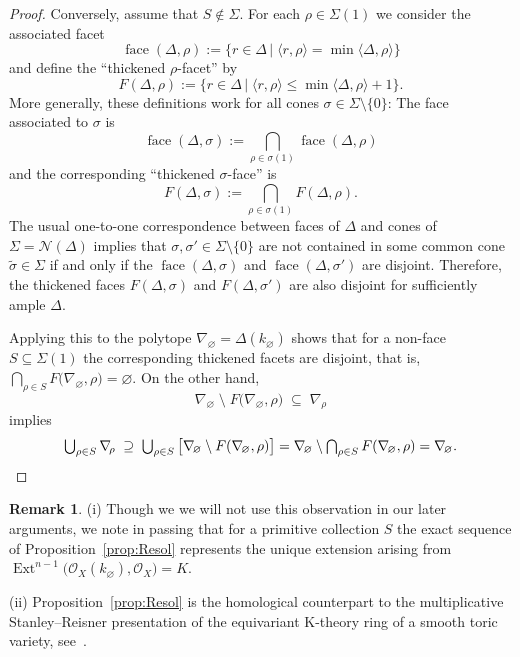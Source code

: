 \documentclass[11pt]{article}
\theoremstyle{definition}
\newtheorem{rema}[theo]{Remark}
\numberwithin{equation}{section}
\newcommand{\cN}{\mathcal{N}}
\DeclareMathOperator{\face}{face}
\newcommand{\CO}{{\mathcal O}}
\newcommand{\til}[1]{\widetilde{#1}}
\newcommand{\gExt}{\operatorname{Ext}}
\newcommand{\kst }{\,|\;}
\newcommand{\kk}{K}
\newcommand{\normal}{\cN}
\begin{document}
\begin{proof}
Conversely, assume that $S\notin\Sigma$.
For each $\rho\in\Sigma(1)$ we consider 
the associated facet 
$$
\face(\Delta,\rho):=\{r\in\Delta\kst \langle r,\rho\rangle
=\min\langle\Delta,\rho\rangle\}
$$ 
and define the ``thickened $\rho$-facet'' 
by
$$
F(\Delta,\rho):=\{r\in\Delta\kst \langle r,
\rho\rangle \leq
\min\langle\Delta,\rho\rangle + 1\}.
$$
More generally, these definitions work 
for all cones 
$\sigma\in\Sigma\setminus\{0\}$:
The face associated to $\sigma$ is
$$
\face(\Delta,\sigma):=
\bigcap_{\rho\in\sigma(1)}\face(\Delta,\rho)
$$
and the corresponding ``thickened 
$\sigma$-face'' is 
$$
F(\Delta,\sigma):=\bigcap_{\rho\in\sigma(1)}
F(\Delta,\rho).
$$
The usual one-to-one correspondence between 
faces of $\Delta$ and cones of
$\Sigma=\normal(\Delta)$ implies that 
$\sigma,\sigma'\in\Sigma\setminus\{0\}$
are not contained in some common cone 
$\til{\sigma}\in\Sigma$ if and only if the
$\face(\Delta,\sigma)$ and 
$\face(\Delta,\sigma')$ are disjoint. 
Therefore, the thickened faces 
$F(\Delta,\sigma)$ and $F(\Delta,\sigma')$ are 
also disjoint for sufficiently ample $\Delta$.

Applying this to the polytope 
$\nabla_{\!\varnothing}=\Delta(k_{\varnothing})$
shows that for a non-face $S\subseteq\Sigma(1)$
the corresponding thickened facets are disjoint, 
that is, 
$\bigcap_{\rho\in S}F\big(\nabla_{\!\varnothing},
\rho\big)=\varnothing$. On the other hand, 
$$
\nabla_{\!\varnothing} \;\setminus\;
F\big(\nabla_{\!\varnothing},\rho\big)
\;\subseteq\; \nabla_{\!\rho}
$$
implies
$$
\renewcommand{\arraystretch}{1.3}
\textstyle
\bigcup_{\rho\in S}\nabla_{\!\rho}
\;\supseteq\; \bigcup_{\rho\in S}\big[
\nabla_{\!\varnothing} \setminus 
F(\nabla_{\!\varnothing},\rho)\big]
=  \nabla_{\!\varnothing} \setminus
\bigcap_{\rho\in S} F(\nabla_{\!\varnothing},\rho)
=  \nabla_{\!\varnothing}.
\vspace{-4ex}
$$
\vspace{2ex}
\end{proof}

\begin{rema}\label{rem:PC}
(i) Though we we will not use this observation 
in our later arguments, we note in passing
that for a primitive collection $S$ the 
exact sequence of Proposition~\ref{prop:Resol} 
represents the unique extension arising from 
$\gExt^{n-1}\big(\CO_X(k_\varnothing),\CO_X\big)=\kk$.

{(ii) Proposition~\ref{prop:Resol} 
is the homological counterpart to the multiplicative 
Stanley--Reisner presentation of the equivariant 
K-theory ring of a smooth toric variety, see~\cite{vv}.}
\end{rema}
\end{document}
